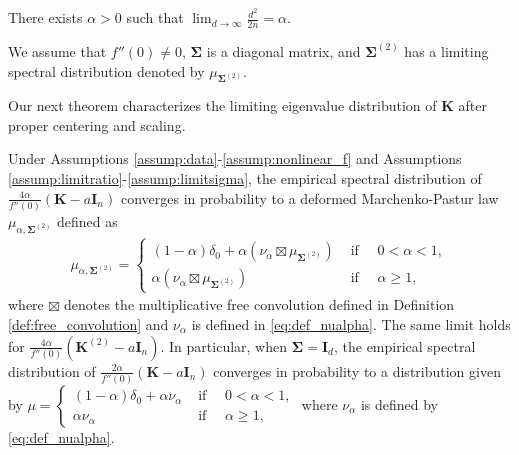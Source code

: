 \documentclass[twoside,11pt]{article}
\def\bI{{\mathbf I}}
\def\bK{{\boldsymbol K}}
\def\bSigma{{\boldsymbol \Sigma}}
\renewcommand{\bK}{\boldsymbol{K}}
\newcommand{\1}{\mathbf{1}}
\begin{document}
\begin{assumption}\label{assump:limitratio}
There exists $\alpha>0$ such that
  $\lim_{d\to\infty}\frac{d^2}{2n}=\alpha$.  
\end{assumption}

\begin{assumption}\label{assump:limitsigma}
We assume that $f''(0)\not=0$, $\bSigma$ is a diagonal matrix, and  $\bSigma^{(2)}$ has a limiting spectral distribution denoted by $\mu_{\bSigma^{(2)}}$.
\end{assumption}

Our next theorem characterizes the limiting eigenvalue distribution of $\bK$ after proper centering and scaling. 

\begin{theorem} \label{thm:globallaw}
Under Assumptions \ref{assump:data}-\ref{assump:nonlinear_f} and Assumptions \ref{assump:limitratio}-\ref{assump:limitsigma},
the empirical spectral distribution of  $\frac{4\alpha}{f''(0)}(\bK-a \bI_n)$ converges in probability to a deformed Marchenko-Pastur law $\mu_{\alpha,\bSigma^{(2)}}$ defined as
   \begin{align}\label{eq:defmu}
       \mu_{\alpha,\bSigma^{(2)}}=  \begin{cases}
             (1-\alpha)\delta_0+\alpha\left(\nu_{\alpha}\boxtimes \mu_{\bSigma^{(2)}}\right) & \text{ if }\quad  0<\alpha <1,\\
            \alpha\left(\nu_{\alpha}\boxtimes \mu_{\bSigma^{(2)}}\right) & \text{ if } \quad \alpha\geq 1,
         \end{cases}
     \end{align}   
     where $\boxtimes$ denotes the multiplicative free convolution defined in Definition \ref{def:free_convolution} and $\nu_{\alpha}$ is defined in \eqref{eq:def_nualpha}. The same limit  holds for $\frac{4\alpha}{f''(0)}(\bK^{(2)}-a \bI_n)$.
     In particular, when $\bSigma=\bI_d$,  the empirical spectral distribution of  $\frac{2\alpha}{f''(0)}(\bK-a \bI_n)$ converges in probability to a distribution given by
     $
     \mu=
     \begin{cases}
             (1-\alpha)\delta_0+\alpha \nu_{\alpha} &\text{ if } \quad 0<\alpha <1,\\
             \alpha\nu_{\alpha}& \text{ if } \quad\alpha\geq 1,
         \end{cases}
     $
     where $\nu_\alpha$ is defined by \eqref{eq:def_nualpha}. 
\end{theorem}
\end{document}
